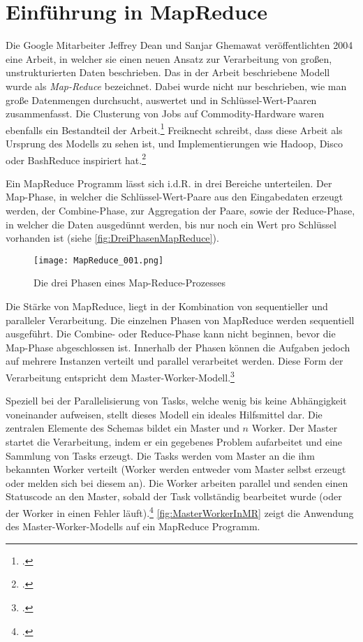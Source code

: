 \section{Einführung in MapReduce}\label{sec:EinführungInMapReduce}
Die Google Mitarbeiter Jeffrey Dean und Sanjar Ghemawat veröffentlichten 2004 eine Arbeit, in welcher sie einen neuen Ansatz zur Verarbeitung von großen, unstrukturierten Daten beschrieben. Das in der Arbeit beschriebene Modell wurde als \textit{Map-Reduce} bezeichnet. Dabei wurde nicht nur beschrieben, wie man große Datenmengen durchsucht, auswertet und in Schlüssel-Wert-Paaren zusammenfasst. Die Clusterung von Jobs auf \gls{Commodity-Hardware} waren ebenfalls ein Bestandteil der Arbeit.\footcite[Vgl.][Abstract]{Dean.2004} Freiknecht schreibt, dass diese Arbeit als Ursprung des Modells zu sehen ist, und Implementierungen wie Hadoop, Disco oder BashReduce inspiriert hat.\footcite[Vgl.][S. 42]{Freiknecht.2014}

Ein MapReduce Programm lässt sich i.d.R. in drei Bereiche unterteilen. Der Map-Phase, in welcher die Schlüssel-Wert-Paare aus den Eingabedaten erzeugt werden, der Combine-Phase, zur Aggregation der Paare, sowie der Reduce-Phase, in welcher die Daten ausgedünnt werden, bis nur noch ein Wert pro Schlüssel vorhanden ist (siehe \autoref{fig:DreiPhasenMapReduce}).

\begin{figure}[h]
	\centering
	\texttt{[image: MapReduce\_001.png]}
	\caption{Die drei Phasen eines Map-Reduce-Prozesses\footnotemark}
	\label{fig:DreiPhasenMapReduce}
\end{figure}

Die Stärke von MapReduce, liegt in der Kombination von sequentieller und paralleler Verarbeitung. Die einzelnen Phasen von MapReduce werden sequentiell ausgeführt. Die Combine- oder Reduce-Phase kann nicht beginnen, bevor die Map-Phase abgeschlossen ist. Innerhalb der Phasen können die Aufgaben jedoch auf mehrere Instanzen verteilt und parallel verarbeitet werden. Diese Form der Verarbeitung entspricht dem Master-Worker-Modell.\footcite[Vgl.][S.1 f]{Karloff.2010}

Speziell bei der Parallelisierung von Tasks, welche wenig bis keine Abhängigkeit voneinander aufweisen, stellt dieses Modell ein ideales Hilfsmittel dar. Die zentralen Elemente des Schemas bildet ein Master und $n$ Worker. Der Master startet die Verarbeitung, indem er ein gegebenes Problem aufarbeitet und eine Sammlung von Tasks erzeugt.  Die Tasks werden vom Master an die ihm bekannten Worker verteilt (Worker werden entweder vom Master selbst erzeugt oder melden sich bei diesem an). Die Worker arbeiten parallel und senden einen Statuscode an den Master, sobald der Task vollständig bearbeitet wurde (oder der Worker in einen Fehler läuft).\footcite[Vgl.][S. 80 ff]{Fey.2008} \autoref{fig:MasterWorkerInMR} zeigt die Anwendung des Master-Worker-Modells auf ein MapReduce Programm.

